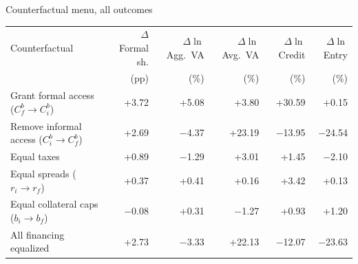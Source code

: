 \documentclass[aspectratio=169]{beamer}
\begin{document}
\begin{frame}[noframenumbering]{Counterfactual menu, all outcomes}
\label{secondcounterfactual}
 
\footnotesize
\begin{tabular}{lrrrrr}
\toprule
Counterfactual & $\Delta$ Formal sh. & $\Delta\ln$ Agg.\ VA & $\Delta\ln$ Avg.\ VA & $\Delta\ln$ Credit & $\Delta\ln$ Entry \\
 & (pp) & (\%) & (\%) & (\%) & (\%) \\
\midrule
Grant formal access ($C^b_f \to C^b_i$) & +3.72 & +5.08 & +3.80 & +30.59 & +0.15 \\
Remove informal access ($C^b_i \to C^b_f$) & +2.69 & $-$4.37 & +23.19 & $-$13.95 & $-$24.54 \\
Equal taxes & +0.89 & $-$1.29 & +3.01 & +1.45 & $-$2.10 \\
Equal spreads ($r_i \to r_f$) & +0.37 & +0.41 & +0.16 & +3.42 & +0.13 \\
Equal collateral caps ($b_i\to b_f$) & $-$0.08 & +0.31 & $-$1.27 & +0.93 & +1.20 \\
All financing equalized & +2.73 & $-$3.33 & +22.13 & $-$12.07 & $-$23.63 \\
\bottomrule
\end{tabular}
 
\vspace{5mm}
 
\hyperlink{maincounterfactual}{}
 
\end{frame}
 
 
\end{document}
